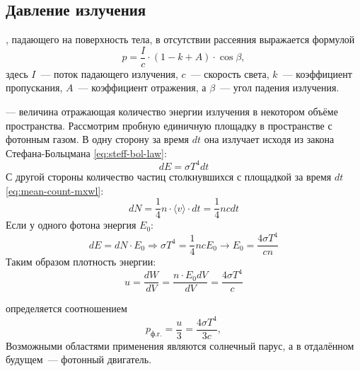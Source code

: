 \subsection{Давление излучения}
, падающего на поверхность тела, в отсутствии рассеяния выражается формулой
\begin{equation}
    p = \frac{I}{c} \cdot (1 - k + A) \cdot \cos \beta,
\end{equation}
здесь $I$~--- поток падающего излучения, $c$~--- скорость света, $k$~--- коэффициент пропускания, $A$~--- коэффициент отражения, а $\beta$~--- угол падения излучения.

 — величина отражающая количество энергии излучения в некотором объёме пространства. Рассмотрим пробную единичную площадку в пространстве с фотонным газом. В одну сторону за время $dt$ она излучает исходя из закона Стефана-Больцмана \eqref{eq:steff-bol-law}:
\begin{equation*}
	d E=\sigma T^4 d t
\end{equation*}
С другой стороны количество частиц столкнувшихся с площадкой за время $dt$ \eqref{eq:mean-count-mxwl}:
\begin{equation*}
d N=\frac{1}{4} n \cdot\langle v\rangle \cdot d t=\frac{1}{4} n c d t
\end{equation*}
Если у одного фотона энергия $E_0$:
\begin{equation*}
d E=d N \cdot E_0 \Rightarrow \sigma T^4=\frac{1}{4} n c E_0 \rightarrow E_0=\frac{4 \sigma T^4}{c n}
\end{equation*}
Таким образом плотность энергии:
\begin{equation}
	u=\frac{d W}{d V}=\frac{n \cdot E_0 d V}{d V}=\frac{4 \sigma T^4}{c}
\end{equation}

 определяется соотношением
\begin{equation}
    p_\text{ф.г.} = \frac{u}{3} = \frac{4 \sigma T^4}{3c},
\end{equation}
Возможными областями применения являются солнечный парус, а в отдалённом будущем~--- фотонный двигатель.
